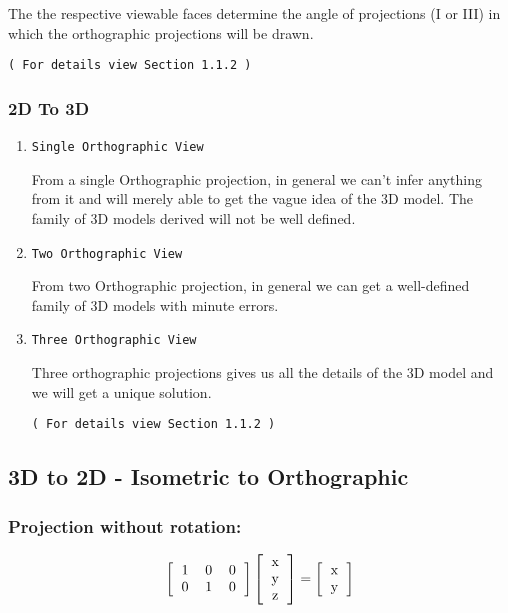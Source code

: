 \documentclass{report}
\begin{document}
The the respective viewable faces determine the angle of projections (I or III) in which the orthographic projections will be drawn.

\texttt{( For details view Section 1.1.2 )}

\subsubsection{2D To 3D}

\begin{enumerate}
    \item \texttt{Single Orthographic View}
    
    From a single Orthographic projection, in general we can't infer anything from it and will merely able to get the vague idea of the 3D model. The family of 3D models derived will not be well defined.
    
    \item \texttt{Two Orthographic View}
    
    From two Orthographic projection, in general we can get a well-defined family of 3D models with minute errors.
    
    \item \texttt{Three Orthographic View}
    
    Three orthographic projections gives us all the details of the 3D model and we will get a unique solution.
    
    \texttt{( For details view Section 1.1.2 )}

\end{enumerate}

\subsection{3D to 2D - Isometric to Orthographic}

\subsubsection{Projection without rotation:}

$$
\left [
  \begin{tabular}{ccc}
  1 & 0 & 0 \\
  0 & 1 & 0
  \end{tabular}
\right ]
\left [
  \begin{tabular}{c}
  x \\
  y \\
  z
  \end{tabular}
\right ]
 = 
\left [
  \begin{tabular}{c}
  x \\
  y 
  \end{tabular}
\right ]
$$
\end{document}
